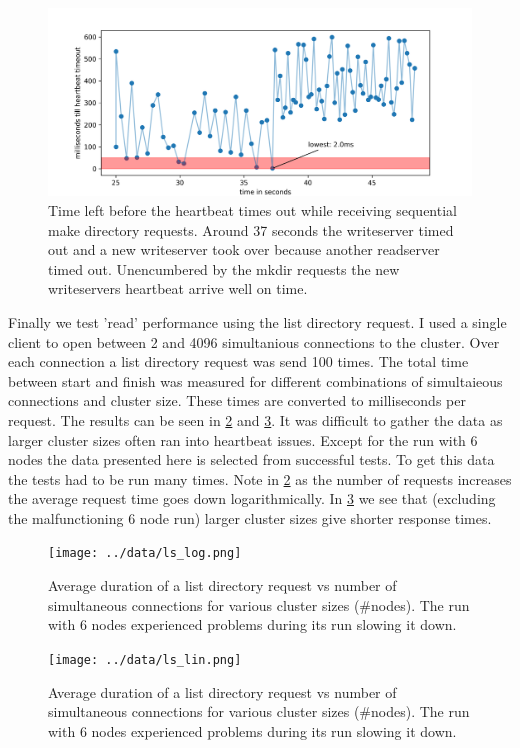 \begin{figure}[htbp]
	\centering
	\includegraphics{../data/hb_timeout.png}
	\caption{Time left before the heartbeat times out while receiving sequential make directory requests. Around 37 seconds the writeserver timed out and a new writeserver took over because another readserver timed out. Unencumbered by the mkdir requests the new writeservers heartbeat arrive well on time.}
	\label{fig:hbt}
\end{figure}

Finally we test 'read' performance using the list directory request. I used a single client to open between 2 and 4096 simultanious connections to the cluster. Over each connection a list directory request was send 100 times. The total time between start and finish was measured for different combinations of simultaieous connections and cluster size. These times are converted to milliseconds per request. The results can be seen in \cref{fig:ls_log} and \cref{fig:ls_lin}. 
It was difficult to gather the data as larger cluster sizes often ran into heartbeat issues. Except for the run with 6 nodes the data presented here is selected from successful tests. To get this data the tests had to be run many times.
Note in \cref{fig:ls_log} as the number of requests increases the average request time goes down logarithmically. In \cref{fig:ls_lin} we see that (excluding the malfunctioning 6 node run) larger cluster sizes give shorter response times.

\begin{figure}[htbp]
	\centering
	\texttt{[image: ../data/ls\_log.png]}
	\caption{Average duration of a list directory request vs number of simultaneous connections for various cluster sizes (\#nodes). The run with 6 nodes experienced problems during its run slowing it down.}
	\label{fig:ls_log}
\end{figure}

\begin{figure}[htbp]
	\centering
	\texttt{[image: ../data/ls\_lin.png]}
	\caption{Average duration of a list directory request vs number of simultaneous connections for various cluster sizes (\#nodes). The run with 6 nodes experienced problems during its run slowing it down.}
	\label{fig:ls_lin}
\end{figure}
